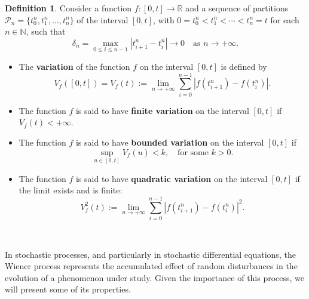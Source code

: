 \documentclass[
  11pt,
  a4paper,
]{book}
\theoremstyle{definition}
\newtheorem{definition}{Definition}[chapter]
\theoremstyle{definition}
\theoremstyle{definition}
\theoremstyle{definition}
\theoremstyle{remark}
\begin{document}
\begin{definition}

Consider a function \(f:[0,t] \rightarrow \mathbb{R}\) and a sequence of partitions \(\mathcal{P}_n = \{t_0^n, t_1^n, \ldots, t_n^n\}\) of the interval \([0,t]\), with \(0 = t_0^n < t_1^n < \cdots < t_n^n = t\) for each \(n \in \mathbb{N}\), such that
\[
\delta_n = \max_{0 \leq i \leq n-1} |t_{i+1}^n - t_i^n| \to 0 \quad \text{as } n \to +\infty.
\]

\begin{itemize}
\item
  The \textbf{variation} of the function \(f\) on the interval \([0,t]\) is defined by
  \[
  V_f([0,t]) = V_f(t) := \lim_{n \to +\infty} \sum_{i=0}^{n-1} |f(t_{i+1}^n) - f(t_i^n)|.
  \]
\item
  The function \(f\) is said to have \textbf{finite variation} on the interval \([0,t]\) if \(V_f(t) < +\infty\).
\item
  The function \(f\) is said to have \textbf{bounded variation} on the interval \([0,t]\) if
  \[
  \sup_{u \in [0,t]} V_f(u) < k, \quad \text{for some } k > 0.
  \]
\item
  The function \(f\) is said to have \textbf{quadratic variation} on the interval \([0,t]\) if the limit exists and is finite:
  \[
  V_f^2(t) := \lim_{n \to +\infty} \sum_{i=0}^{n-1} |f(t_{i+1}^n) - f(t_i^n)|^2.
  \]
\end{itemize}

\end{definition}

\(\,\)

In stochastic processes, and particularly in stochastic differential equations, the Wiener process represents the accumulated effect of random disturbances in the evolution of a phenomenon under study. Given the importance of this process, we will present some of its properties.

\(\,\)
\end{document}
